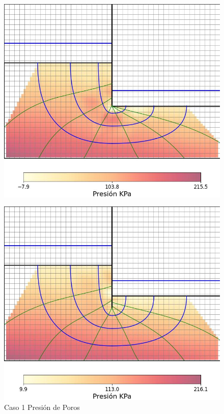 \begin{figure}[H]
    \centering
    \begin{minipage}{0.32\textwidth}
        \centering
        \includegraphics[width=\textwidth]{GRAFICOS/caso_1_presion_poros.jpg}
        \caption{Caso 1 Presión de Poros}
        \label{fig:caso_1_presion_poros}
    \end{minipage}
    \begin{minipage}{0.32\textwidth}
        \centering
        \includegraphics[width=\textwidth]{GRAFICOS/caso_2_presion_poros.jpg}

\end{minipage}
\end{figure}
